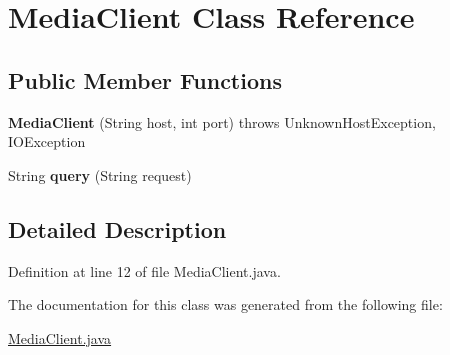 \hypertarget{class_media_client}{}\section{Media\+Client Class Reference}
\label{class_media_client}
\subsection*{Public Member Functions}
\begin{DoxyCompactItemize}
\item 
\mbox{\label{class_media_client_ad0b637ad6f2ce3e835e2c948cf566fc0}} 
{\bfseries Media\+Client} (String host, int port)  throws Unknown\+Host\+Exception, I\+O\+Exception 
\item 
\mbox{\label{class_media_client_a21bc2d2d79aee00d0c65e23c18d93ad3}} 
String {\bfseries query} (String request)
\end{DoxyCompactItemize}


\subsection{Detailed Description}


Definition at line 12 of file Media\+Client.\+java.



The documentation for this class was generated from the following file\+:\begin{DoxyCompactItemize}
\item 
\mbox{\hyperlink{_media_client_8java}{Media\+Client.\+java}}\end{DoxyCompactItemize}
